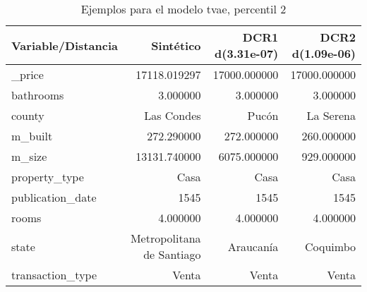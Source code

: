 \begin{table}[H]
\centering
\fontsize{10}{14}\selectfont
\caption{Ejemplos para el modelo tvae, percentil 2}
\label{table-example-economicos-a-3-tvae-2p}
\begin{tabular}{|l|r|r|r|}
\hline
\rowcolor[gray]{0.8}
Variable/Distancia & Sintético & DCR1 d(3.31e-07) & DCR2 d(1.09e-06) \\
\hline \_price & \cellcolor[rgb]{0.9, 0.54, 0.52} 17118.019297 & 17000.000000 & 17000.000000 \\
\hline bathrooms & \cellcolor[rgb]{0.9, 0.54, 0.52} 3.000000 & \cellcolor[rgb]{0.9, 0.54, 0.52} 3.000000 & \cellcolor[rgb]{0.9, 0.54, 0.52} 3.000000 \\
\hline county & \cellcolor[rgb]{0.9, 0.54, 0.52} Las Condes & Pucón & La Serena \\
\hline m\_built & \cellcolor[rgb]{0.9, 0.54, 0.52} 272.290000 & 272.000000 & 260.000000 \\
\hline m\_size & \cellcolor[rgb]{0.9, 0.54, 0.52} 13131.740000 & 6075.000000 & 929.000000 \\
\hline property\_type & \cellcolor[rgb]{0.9, 0.54, 0.52} Casa & \cellcolor[rgb]{0.9, 0.54, 0.52} Casa & \cellcolor[rgb]{0.9, 0.54, 0.52} Casa \\
\hline publication\_date & \cellcolor[rgb]{0.9, 0.54, 0.52} 1545 & \cellcolor[rgb]{0.9, 0.54, 0.52} 1545 & \cellcolor[rgb]{0.9, 0.54, 0.52} 1545 \\
\hline rooms & \cellcolor[rgb]{0.9, 0.54, 0.52} 4.000000 & \cellcolor[rgb]{0.9, 0.54, 0.52} 4.000000 & \cellcolor[rgb]{0.9, 0.54, 0.52} 4.000000 \\
\hline state & \cellcolor[rgb]{0.9, 0.54, 0.52} Metropolitana de Santiago & Araucanía & Coquimbo \\
\hline transaction\_type & \cellcolor[rgb]{0.9, 0.54, 0.52} Venta & \cellcolor[rgb]{0.9, 0.54, 0.52} Venta & \cellcolor[rgb]{0.9, 0.54, 0.52} Venta \\
\hline
\end{tabular}
\end{table}
